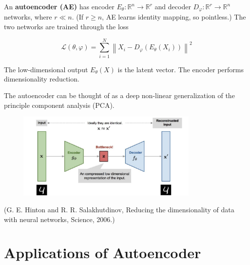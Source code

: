 \begin{definition}[9.3][Autoencoder]
    An \textbf{autoencoder (AE)} has encoder $E_{\theta}: \mathbb{R}^{n} \rightarrow \mathbb{R}^{r}$ and decoder $D_{\varphi}: \mathbb{R}^{r} \rightarrow \mathbb{R}^{n}$ networks, where $r \ll n$. (If $r \geq n$, AE learns identity mapping, so pointless.) The two networks are trained through the loss

    $$
    \mathcal{L}(\theta, \varphi)=\sum_{i=1}^{N}\left\|X_{i}-D_{\varphi}\left(E_{\theta}\left(X_{i}\right)\right)\right\|^{2}
    $$

    The low-dimensional output $E_{\theta}(X)$ is the latent vector. The encoder performs dimensionality reduction.

    The autoencoder can be thought of as a deep non-linear generalization of the principle component analysis (PCA).

    \begin{figure}[H]
        \centering
        \includegraphics[width=0.8\textwidth]{.././assets/9.1.png}
    \end{figure}

    (G. E. Hinton and R. R. Salakhutdinov, Reducing the dimensionality of data with neural networks, Science, 2006.)
\end{definition}

\section{Applications of Autoencoder}

